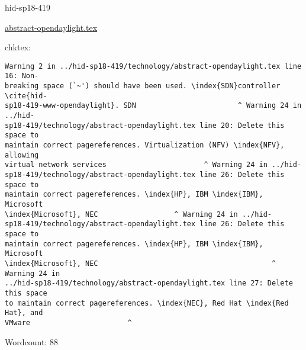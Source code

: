 

\begin{IU}

hid-sp18-419

\href{https://github.com/cloudmesh-community/hid-sp18-419/blob/master//technology/abstract-opendaylight.tex}{abstract-opendaylight.tex}

 
chktex:
\begin{tiny}
\begin{verbatim}
Warning 2 in ../hid-sp18-419/technology/abstract-opendaylight.tex line 16: Non-
breaking space (`~') should have been used. \index{SDN}controller \cite{hid-
sp18-419-www-opendaylight}. SDN                        ^ Warning 24 in ../hid-
sp18-419/technology/abstract-opendaylight.tex line 20: Delete this space to
maintain correct pagereferences. Virtualization (NFV) \index{NFV}, allowing
virtual network services                       ^ Warning 24 in ../hid-
sp18-419/technology/abstract-opendaylight.tex line 26: Delete this space to
maintain correct pagereferences. \index{HP}, IBM \index{IBM}, Microsoft
\index{Microsoft}, NEC                  ^ Warning 24 in ../hid-
sp18-419/technology/abstract-opendaylight.tex line 26: Delete this space to
maintain correct pagereferences. \index{HP}, IBM \index{IBM}, Microsoft
\index{Microsoft}, NEC                                         ^ Warning 24 in
../hid-sp18-419/technology/abstract-opendaylight.tex line 27: Delete this space
to maintain correct pagereferences. \index{NEC}, Red Hat \index{Red Hat}, and
VMware                       ^
\end{verbatim}
\end{tiny}

Wordcount: 88

\end{IU}



